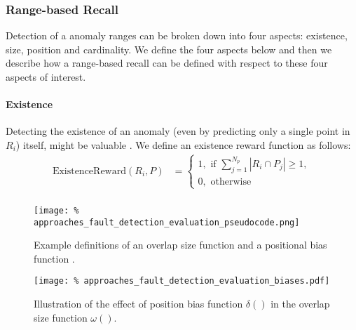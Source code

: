 \subsubsection{Range-based Recall}

Detection of a anomaly ranges can be broken down into four aspects: existence, size, position and cardinality.
We define the four aspects below and then we describe how a range-based recall can be defined with respect to these four aspects of interest. 

\paragraph{Existence}
Detecting the existence of an anomaly (even by predicting only a single point in $R_i$) itself, might be valuable \cite{tatbul2018precision}.
We define an existence reward function as follows:
\begin{align*}
    \text{ExistenceReward}(R_i, P) &= \begin{cases}
            1, \text{ if } \sum_{j=1}^{N_p}|R_i \cap P_j| \geq 1,\\
            0, \text{ otherwise}
    \end{cases}\\
\end{align*}

\begin{figure}
    \texttt{[image: \%
        approaches\_fault\_detection\_evaluation\_pseudocode.png]}
    \caption{Example definitions of an overlap size function and a positional bias function \cite{tatbul2018precision}.}
    \label{fig:approaches_fault_detection_evaluation_pseudocode}
    \centering
\end{figure}

\begin{figure}
    \centering
    \texttt{[image: \%
        approaches\_fault\_detection\_evaluation\_biases.pdf]}
    \caption{Illustration of the effect of position bias function $\delta()$ in the overlap size function $\omega()$.}
    \label{fig:approaches_fault_detection_evaluation_biases}
    \centering
\end{figure}

